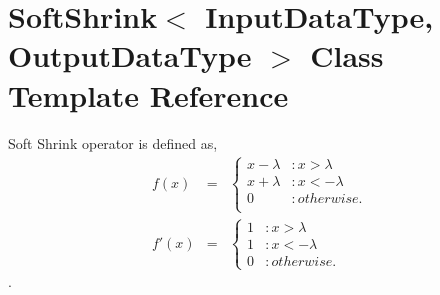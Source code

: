 \section{Soft\+Shrink$<$ Input\+Data\+Type, Output\+Data\+Type $>$ Class Template Reference}
\label{classmlpack_1_1ann_1_1SoftShrink}


Soft Shrink operator is defined as, \begin{eqnarray*} f(x) &=& \begin{cases} x - \lambda & : x > \lambda \\ x + \lambda & : x < -\lambda \\ 0 & : otherwise. \\ \end{cases} \\ f'(x) &=& \begin{cases} 1 & : x > \lambda \\ 1 & : x < -\lambda \\ 0 & : otherwise. \end{cases} \end{eqnarray*}.  


